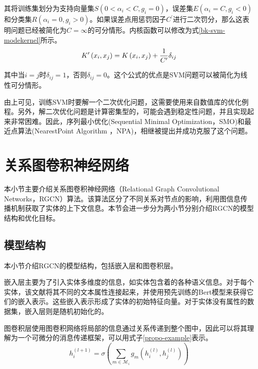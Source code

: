 其将训练集划分为支持向量集$S$$\left(0<\alpha_{i}<C, g_{i}=0\right)$，误差集$E$$\left(\alpha_{i}=C, g_{i}<0\right)$和分类集$R$$\left(\alpha_{i}=0, g_{i}>0\right)$\cite{cauwenberghs2001incremental}。如果误差点用惩罚因子$C^{\prime}$进行二次罚分，那么这表明问题已经被简化为$C=\infty$的可分情形\cite{frie1998kernel}。内核函数可以修改为式\ref{bk-svm-modekernel}所示。
\begin{equation}
    \centering
    K^{\prime}\left(x_{i}, x_{j}\right)=K\left(x_{i}, x_{j}\right)+\frac{1}{C^{\prime}} \delta_{i j}
    \label{bk-svm-modekernel}
\end{equation}

其中当$i=j$时$\delta_{i j}=1$，否则$\delta_{i j}=0$。这个公式的优点是SVM问题可以被简化为线性可分情形\cite{keerthi2000fast}。

由上可见，训练SVM时要解一个二次优化问题，这需要使用来自数值库的优化例程。另外，解二次优化问题是计算密集型的，可能会遇到稳定性问题，并且实现起来非常困难\cite{zeng2008fast}。因此，序列最小优化(Sequential Minimal Optimization，SMO)\cite{keerthi2000fast}和最近点算法(NearestPoint Algorithm ，NPA)\cite{zeng2008fast}，相继被提出并成功克服了这个问题。


\section{关系图卷积神经网络}\label{RGCN}
本小节主要介绍关系图卷积神经网络（Relational Graph Convolutional Networks，RGCN）算法\cite{schlichtkrull2018modeling}。该算法区分了不同关系对节点的影响，利用图信息传播机制获取了实体的上下文信息。本节会进一步分为两小节分别介绍RGCN的模型结构和优化目标。
\subsection{模型结构}
本小节介绍RGCN的模型结构，包括嵌入层和图卷积层。

嵌入层主要为了引入实体多维度的信息，如实体包含着的各种语义信息。对于每个实体，该文献将其不同的文本属性连接起来，并使用预先训练的Bert\cite{devlin2018bert}模型来获得它们的嵌入表示。这些嵌入表示形成了实体的初始特征向量。对于实体没有属性的数据集，嵌入层则是随机初始化的。

图卷积层使用图卷积网络将局部的信息通过关系传递到整个图中，因此可以将其理解为一个可微分的消息传递框架，可以用式子\ref{propo-example}表示。
\begin{equation}
    h_{i}^{(l+1)}=\sigma\left(\sum_{m \in \mathcal{M}_{i}} g_{m}\left(h_{i}^{(l)}, h_{j}^{(l)}\right)\right)
    \label{propo-example}
\end{equation}

